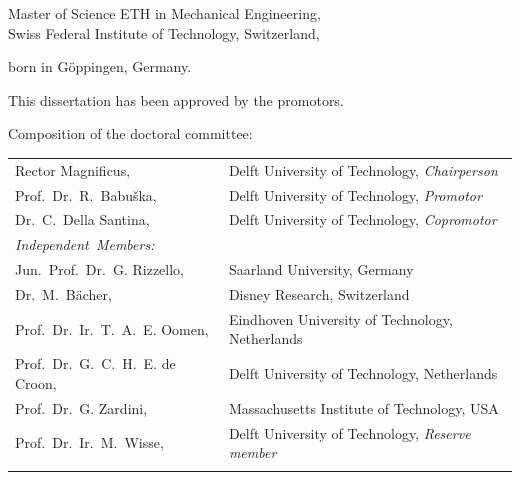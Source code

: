 \begin{titlepage}
\begin{center}
\bigskip
\bigskip

Master of Science ETH in Mechanical Engineering, \\
Swiss Federal Institute of Technology, Switzerland,

born in Göppingen, Germany.

\vspace*{2\bigskipamount}

\end{center}

\clearpage
\thispagestyle{empty}

\noindent This dissertation has been approved by the promotors.


\bigskip
\noindent Composition of the doctoral committee:

\medskip\noindent
\begin{tabular}{p{4.5cm}l}
    Rector Magnificus, & Delft University of Technology, \emph{Chairperson} \\
    Prof.\ Dr.\ R.\ Babu\v{s}ka, & Delft University of Technology, \emph{Promotor} \\
    Dr.\ C.\ Della Santina, & Delft University of Technology, \emph{Copromotor} \\

    \medskip
    \mbox{\emph{Independent Members:}} & \\
    Jun.\ Prof.\ Dr.\ G. Rizzello, & Saarland University, Germany\\
    Dr.\ M.\ Bächer, & Disney Research, Switzerland \\
    Prof.\ Dr.\ Ir.\ T.\ A.\ E. Oomen, & Eindhoven University of Technology, Netherlands\\
    Prof.\ Dr.\ G.\ C.\ H.\ E. de Croon, & Delft University of Technology, Netherlands\\
    Prof.\ Dr.\ G. Zardini, & Massachusetts Institute of Technology, USA\\ %
    Prof.\ Dr.\ Ir.\ M.\ Wisse, & Delft University of Technology, \emph{Reserve member} \\ \\


\end{tabular}
\end{titlepage}
